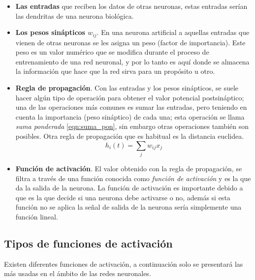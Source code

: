 \begin{itemize}
\item \textbf{Las entradas} que reciben los datos de otras neuronas, estas entradas ser\'{i}an las dendritas de una neurona biol\'{o}gica.
\item \textbf{Los pesos sin\'{a}pticos $w_{ij}$}. En una neurona artificial a aquellas entradas que vienen de otras neuronas se les asigna un peso (factor de importancia). Este peso es un valor num\'{e}rico que se modifica durante el proceso de entrenamiento de una red neuronal, y por lo tanto es aqu\'{i} donde se almacena la informaci\'{o}n que hace que la red sirva para un prop\'{o}sito u otro.
\item \textbf{Regla de propagaci\'{o}n}. Con las entradas y los pesos sin\'{a}pticos, se suele hacer alg\'{u}n tipo de operaci\'{o}n para obtener el valor potencial postsin\'{a}ptico; una de las operaciones m\'{a}s comunes es sumar las entradas, pero teniendo en cuenta la importancia (peso sin\'{a}ptico) de cada una; esta operaci\'{o}n se llama \textit{suma ponderada} \ref{eqn:suma_pon}, sin embargo otras operaciones tambi\'{e}n son posibles. Otra regla de propagaci\'{o}n que es habitual es la distancia euclidea.
\begin{equation}
h_{i}(t) = \sum_{j}{w_{ij}x_{j}}
\label{eqn:suma_pon}
\end{equation}
\item \textbf{Funci\'{o}n de activaci\'{o}n}. El valor obtenido con la regla de propagaci\'{o}n, se filtra a trav\'{e}s de una funci\'{o}n conocida como \textit{funci\'{o}n de activaci\'{o}n} y es la que da la salida de la neurona. La función de activación es importante debido a que es la que decide si una neurona debe activarse o no, adem\'{a}s si esta función no se aplica la señal de salida de la neurona sería simplemente una función lineal.
\end{itemize}

\subsection{Tipos de funciones de activaci\'{o}n}

Existen diferentes funciones de activaci\'{o}n, a continuaci\'{o}n solo se presentar\'{a} las m\'{a}s usadas en el \'{a}mbito de las redes neuronales.

